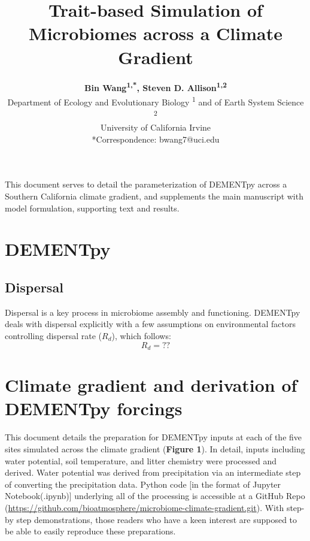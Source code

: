 \documentclass[letterpaper, 10pt]{article}
\begin{document}
\setlength{\droptitle}{-8em} 
\title{\Large\textbf{Trait-based Simulation of Microbiomes across a Climate Gradient}\vspace{-0em}}
\author{\normalsize\textbf{Bin Wang\textsuperscript{1,*}, Steven D. Allison\textsuperscript{1,2}}\vspace{1em} \\
Department of Ecology and Evolutionary Biology \textsuperscript{1}  and of Earth System Science \textsuperscript{2} \\
University of California Irvine\vspace{1em} \\
*Correspondence: bwang7@uci.edu} 
\maketitle

This document serves to detail the parameterization of DEMENTpy across a Southern California
climate gradient, and supplements the main manuscript with model formulation, supporting text and results.

\section{DEMENTpy}

\subsection{Dispersal}
Dispersal is a key process in microbiome assembly and functioning. DEMENTpy deals with
dispersal explicitly with a few assumptions on environmental factors controlling dispersal rate ($R_{d}$),
which follows:
\begin{equation}
  R_{d} = ?? 
\end{equation}


\section{Climate gradient and derivation of DEMENTpy forcings}
This document details the preparation for DEMENTpy inputs at each of the five sites simulated across the climate gradient (\textbf{Figure 1}). In detail, inputs including water potential, soil temperature, and litter chemistry were processed and derived. Water potential was derived from precipitation via an intermediate step of converting the precipitation data. Python code [in the format of Jupyter Notebook(.ipynb)] underlying all of the processing is accessible at a GitHub Repo (\url{https://github.com/bioatmosphere/microbiome-climate-gradient.git}). With step-by step demonstrations, those readers who have a keen interest are supposed to be able to easily reproduce these preparations.
\end{document}
